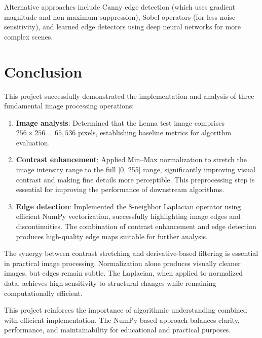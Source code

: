 \documentclass[a4paper,12pt]{article}
\begin{document}
Alternative approaches include Canny edge detection (which uses gradient magnitude and non-maximum suppression), Sobel operators (for less noise sensitivity), and learned edge detectors using deep neural networks for more complex scenes.

\section{Conclusion}
This project successfully demonstrated the implementation and analysis of three fundamental image processing operations:

\begin{enumerate}
    \item \textbf{Image analysis}: Determined that the Lenna test image comprises $256 \times 256 = 65,536$ pixels, establishing baseline metrics for algorithm evaluation.
    
    \item \textbf{Contrast enhancement}: Applied Min--Max normalization to stretch the image intensity range to the full [0, 255] range, significantly improving visual contrast and making fine details more perceptible. This preprocessing step is essential for improving the performance of downstream algorithms.
    
    \item \textbf{Edge detection}: Implemented the 8-neighbor Laplacian operator using efficient NumPy vectorization, successfully highlighting image edges and discontinuities. The combination of contrast enhancement and edge detection produces high-quality edge maps suitable for further analysis.
\end{enumerate}

The synergy between contrast stretching and derivative-based filtering is essential in practical image processing. Normalization alone produces visually cleaner images, but edges remain subtle. The Laplacian, when applied to normalized data, achieves high sensitivity to structural changes while remaining computationally efficient.


This project reinforces the importance of algorithmic understanding combined with efficient implementation. The NumPy-based approach balances clarity, performance, and maintainability for educational and practical purposes.
\end{document}
